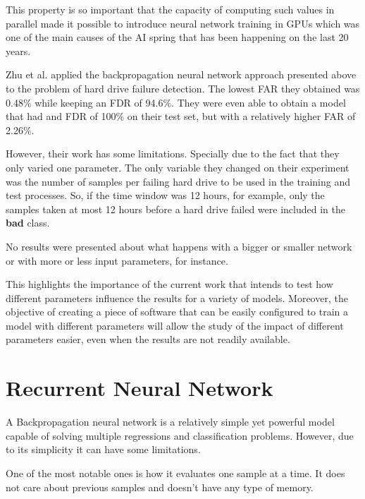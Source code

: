 This property is so important that the capacity of computing such values in parallel made it possible to introduce neural network training in GPUs \cite{steinkraus2005using} which was one of the main causes of the AI spring that has been happening on the last 20 years.

Zhu et al. \cite{Zhu13} applied the backpropagation neural network approach presented above to the problem of hard drive failure detection.
The lowest FAR they obtained was 0.48\% while keeping an FDR of 94.6\%.
They were even able to obtain a model that had and FDR of 100\% on their test set, but with a relatively higher FAR of 2.26\%.

However, their work has some limitations.
Specially due to the fact that they only varied one parameter.
The only variable they changed on their experiment was the number of samples per failing hard drive to be used in the training and test processes.
So, if the time window was 12 hours, for example, only the samples taken at most 12 hours before a hard drive failed were included in the \textbf{bad} class.

No results were presented about what happens with a bigger or smaller network or with more or less input parameters, for instance.

This highlights the importance of the current work that intends to test how different parameters influence the results for a variety of models.
Moreover, the objective of creating a piece of software that can be easily configured to train a model with different parameters will allow the study of the impact of different parameters easier, even when the results are not readily available. 



\section{Recurrent Neural Network}\label{sec:RecurrentNeuralNetwork}

A Backpropagation neural network is a relatively simple yet powerful model capable of solving multiple regressions and classification problems.
However, due to its simplicity it can have some limitations.

One of the most notable ones is how it evaluates one sample at a time.
It does not care about previous samples and doesn't have any type of memory.

